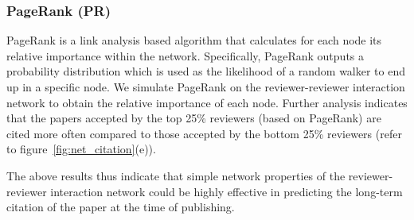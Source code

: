 \subsubsection{PageRank (PR)}

PageRank is a link analysis based algorithm that calculates for each node its relative importance within 
the network. Specifically, PageRank outputs a probability distribution which is used as the likelihood of a random walker to end up in a specific node. We simulate PageRank on the reviewer-reviewer interaction 
network to obtain the relative importance of each node. Further analysis indicates that the papers accepted by the top 25\% reviewers (based on PageRank) are cited more often compared to those accepted by the bottom 25\% reviewers (refer to figure~\ref{fig:net_citation}(e)). 

The above results thus indicate that simple network properties of the reviewer-reviewer interaction network could be highly effective in predicting the long-term citation of the paper at the time of publishing. 
\medskip